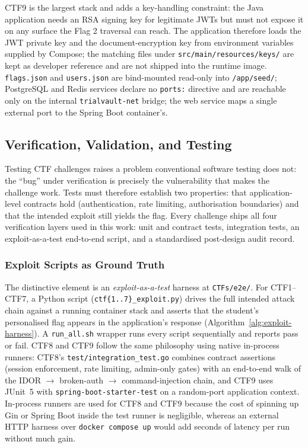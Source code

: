 CTF9 is the largest stack and adds a key-handling
constraint: the Java application needs an RSA signing key
for legitimate JWTs but must not expose it on any surface
the Flag 2 traversal can reach. The application therefore
loads the JWT private key and the document-encryption key
from environment variables supplied by Compose; the
matching files under \texttt{src/main/resources/keys/} are
kept as developer reference and are not shipped into the
runtime image. \texttt{flags.json} and \texttt{users.json}
are bind-mounted read-only into \texttt{/app/seed/};
PostgreSQL and Redis services declare no \texttt{ports:}
directive and are reachable only on the internal
\texttt{trialvault-net} bridge; the web service maps a
single external port to the Spring Boot
container's.

\subsection{Verification, Validation, and Testing}
\label{sec:vvt}

Testing CTF challenges raises a problem conventional
software testing does not: the ``bug'' under verification
is precisely the vulnerability that makes the challenge
work. Tests must therefore establish two properties: that
application-level contracts hold (authentication, rate
limiting, authorisation boundaries) and that the intended
exploit still yields the flag. Every challenge ships all
four verification layers used in this work: unit and
contract tests, integration tests, an exploit-as-a-test
end-to-end script, and a standardised post-design audit
record.

\subsubsection{Exploit Scripts as Ground Truth}

The distinctive element is an \textit{exploit-as-a-test}
harness at \texttt{CTFs/e2e/}. For CTF1--CTF7, a Python
script (\texttt{ctf\{1..7\}\_exploit.py}) drives the full
intended attack chain against a running container stack and
asserts that the student's personalised flag appears in the
application's response (Algorithm~\ref{alg:exploit-harness}).
A \texttt{run\_all.sh} wrapper runs every script sequentially
and reports pass or fail. CTF8 and CTF9 follow the same
philosophy using native in-process runners: CTF8's
\texttt{test/integration\_test.go} combines contract
assertions (session enforcement, rate limiting, admin-only
gates) with an end-to-end walk of the IDOR
$\to$ broken-auth $\to$ command-injection chain, and CTF9
uses JUnit~5 with \texttt{spring-boot-starter-test} on a
random-port application context. In-process runners are
used for CTF8 and CTF9 because the cost of spinning up Gin
or Spring Boot inside the test runner is negligible, whereas
an external HTTP harness over \texttt{docker compose up}
would add seconds of latency per run without much gain.

